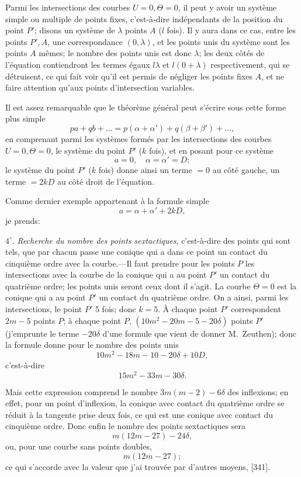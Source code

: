 \documentclass[11pt]{article}
\begin{document}
Parmi les intersections des courbes $U = 0, \Theta = 0$, il peut y avoir un syst\`eme simple ou multiple de points fixes, c'est-\`a-dire ind\'ependants de la position du point $P'$; disons un syst\`eme de $\lambda$ points $A$ ($l$ fois). Il y aura dans ce cas, entre les points $P', A$, une correspondance $(0, \lambda)$, et les points unis du syst\`eme sont les points $A$ m\^emes; le nombre des points unis est donc $\lambda$; les deux c\^ot\'es de l'\'equation contiendront les termes \'egaux $l\lambda$ et $l(0 + \lambda)$ respectivement, qui se d\'etruisent, ce qui fait voir qu'il est permis de n\'egliger les points fixes $A$, et ne faire attention qu'aux points d'intersection variables.

Il est assez remarquable que le th\'eor\`eme g\'en\'eral peut s'\'ecrire sous cette forme plus simple
\[ pa + qb + \ldots = p(\alpha + \alpha') + q(\beta + \beta') + \ldots, \]
en comprenant parmi les syst\`emes form\'es par les intersections des courbes $U = 0, \Theta = 0$, le syst\`eme du point $P'$ ($k$ fois), et en posant pour ce syst\`eme
\[ a = 0,\quad \alpha = \alpha' = D; \]
le syst\`eme du point $P'$ ($k$ fois) donne ainsi un terme $= 0$ au c\^ot\'e gauche, un terme $= 2kD$ au c\^ot\'e droit de l'\'equation.

Comme dernier exemple appartenant \`a la formule simple
\[ a = \alpha + \alpha' + 2kD, \]
je prends:

$4^\circ$. \emph{Recherche du nombre des points sextactiques}, c'est-\`a-dire des points qui sont tels, que par chacun passe une conique qui a dans ce point un contact du cinqui\`eme ordre avec la courbe.---Il faut prendre pour les points $P$ les intersections avec la courbe de la conique qui a au point $P'$ un contact du quatri\`eme ordre; les points unis seront ceux dont il s'agit. La courbe $\Theta = 0$ est la conique qui a au point $P'$ un contact du quatri\`eme ordre. On a ainsi, parmi les intersections, le point $P'$ 5 fois; donc $k = 5$. \`A chaque point $P'$ correspondent $2m - 5$ points $P$; \`a chaque point $P$, $(10m^2 - 20m - 5 - 20\delta)$ points $P'$ (j'emprunte le terme $-20\delta$ d'une formule que vient de donner M.~Zeuthen); donc la formule donne pour le nombre des points unis
\[ 10m^2 - 18m - 10 - 20\delta + 10D, \]
c'est-\`a-dire
\[ 15m^2 - 33m - 30\delta. \]

Mais cette expression comprend le nombre $3m(m - 2) - 6\delta$ des inflexions; en effet, pour un point d'inflexion, la conique avec contact du quatri\`eme ordre se r\'eduit \`a la tangente prise deux fois, ce qui est une conique avec contact du cinqui\`eme ordre. Donc enfin le nombre des points sextactiques sera
\[ m(12m - 27) - 24\delta, \]
ou, pour une courbe sans points doubles,
\[ m(12m - 27); \]
ce qui s'accorde avec la valeur que j'ai trouv\'ee par d'autres moyens, [341].
\end{document}
